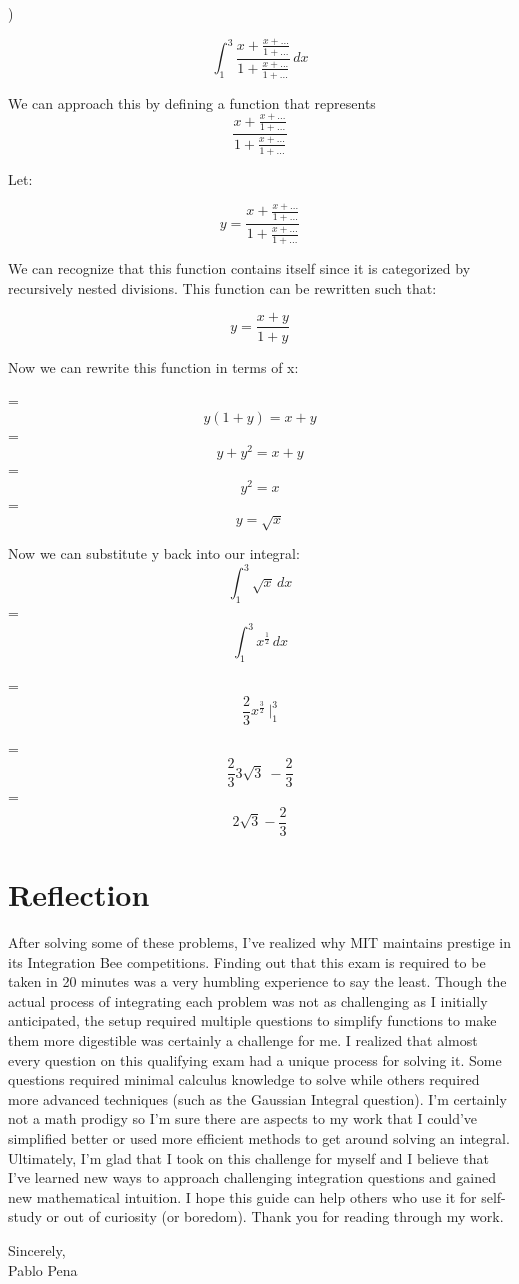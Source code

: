 \documentclass{article}
\begin{document}
)
\begin{flushleft}
\[\int_{1}^{3} \frac{x+\frac{x+...}{1+...}}{1+\frac{x+...}{1+...}} \,dx \]

\noindent We can approach this by defining a function that represents \[\frac{x+\frac{x+...}{1+...}}{1+\frac{x+...}{1+...}}\]

\noindent Let:

\[y = \frac{x+\frac{x+...}{1+...}}{1+\frac{x+...}{1+...}
}\]

\noindent We can recognize that this function contains itself since it is categorized by recursively nested divisions. This function can be rewritten such that:

\[y = \frac{x+y}{1+y}\]

\noindent Now we can rewrite this function in terms of x:

= \[y(1+y) = x+y\]
= \[y+y^2 = x+y\]
= \[y^2 = x\]
= \[y = \sqrt{x}\]

\noindent Now we can substitute y back into our integral:
\[\int_{1}^{3} \sqrt{x}\,dx \]
=\[\int_{1}^{3} x^{\frac{1}{2}}\,dx \]

=\[\frac{2}{3}x^{\frac{3}{2}}\ \Big |_{1}^{3}\]

= \[\frac{2}{3} 3 \sqrt{3}\ - \frac{2}{3}\]
=\[\boxed{2\sqrt{3}-\frac{2}{3}}\]

\section{Reflection}
After solving some of these problems, I've realized why MIT maintains prestige in its Integration Bee competitions. Finding out that this exam is required to be taken in 20 minutes was a very humbling experience to say the least. Though the actual process of integrating each problem was not as challenging as I initially anticipated, the setup required multiple questions to simplify functions to make them more digestible was certainly a challenge for me. I realized that almost every question on this qualifying exam had a unique process for solving it. Some questions required minimal calculus knowledge to solve while others required more advanced techniques (such as the Gaussian Integral question). I'm certainly not a math prodigy so I'm sure there are aspects to my work that I could've simplified better or used more efficient methods to get around solving an integral. Ultimately, I'm glad that I took on this challenge for myself and I believe that I've learned new ways to approach challenging integration questions and gained new mathematical intuition. I hope this guide can help others who use it for self-study or out of curiosity (or boredom). Thank you for reading through my work.

\vspace{1em}

\noindent Sincerely, \\
Pablo Pena
\end{flushleft}
\end{document}
